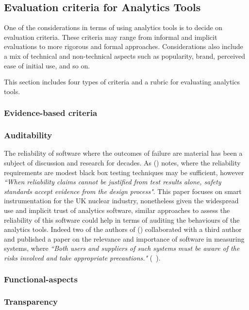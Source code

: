 \subsection{Evaluation criteria for Analytics Tools}
One of the considerations in terms of using analytics tools is to decide on evaluation criteria. These criteria may range from informal and implicit evaluations to more rigorous and formal approaches. Considerations also include a mix of technical and non-technical aspects such as popularity, brand, perceived ease of initial use, and so on.

This section includes four types of criteria and a rubric for evaluating analytics tools.

\subsubsection{Evidence-based criteria}

\subsubsection{Auditability}
The reliability of software where the outcomes of failure are material has been a subject of discussion and research for decades. As (\cite{dobbing1998reliability}) notes, where the reliability requirements are modest black box testing techniques may be sufficient, however \emph{``When reliability claims cannot be justified from test results alone, safety standards accept evidence from the design process"}. This paper focuses on smart instrumentation for the UK nuclear industry, nonetheless given the widespread use and implicit trust of analytics software, similar approaches to assess the reliability of this software could help in terms of auditing the behaviours of the analytics tools. Indeed two of the authors of (\cite{dobbing1998reliability}) collaborated with a third author and published a paper on the relevance and importance of software in measuring systems, where \emph{``Both users and suppliers of such systems must be aware of the risks involved and take appropriate precautions."} (~\cite{wichmann2007software}).

\subsubsection{Functional-aspects}

\subsubsection{Transparency}

